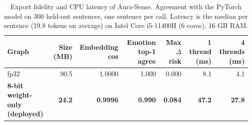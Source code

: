 \begin{table}[t]
\centering
\footnotesize
\caption{Export fidelity and CPU latency of Aura-Sense. Agreement with the PyTorch model on 300 held-out sentences, one sentence per call. Latency is the median per sentence (19.8 tokens on average) on Intel Core i5-11400H (6 cores), 16 GB RAM.}
\label{tab:runtime}
\setlength{\tabcolsep}{4pt}
\begin{tabular}{lrrrrrr}
\toprule
\textbf{Graph} & \textbf{Size (MB)} & \textbf{Embedding cos} & \textbf{Emotion top-1 agree} & \textbf{Max $\Delta$ risk} & \textbf{1 thread (ms)} & \textbf{4 threads (ms)} \\
\midrule
fp32 & 90.5 & 1.0000 & 1.000 & 0.000 & 8.1 & 4.1 \\
\textbf{8-bit weight-only (deployed)} & \textbf{24.2} & \textbf{0.9996} & \textbf{0.990} & \textbf{0.084} & \textbf{47.2} & \textbf{27.8} \\
\bottomrule
\end{tabular}
\end{table}

